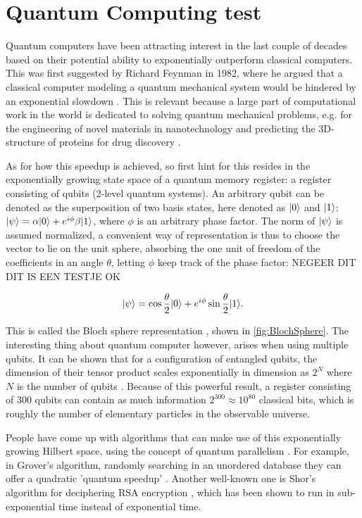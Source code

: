 \section{Quantum Computing test}

Quantum computers have been attracting interest in the last couple of decades based on their potential ability to exponentially outperform classical computers. This was first suggested by Richard Feynman in 1982, where he argued that a classical computer modeling a quantum mechanical system would be hindered by an exponential slowdown \cite{Feynman1982}. This is relevant because a large part of computational work in the world is dedicated to solving quantum mechanical problems, e.g. for the engineering of novel materials in nanotechnology and predicting the 3D-structure of proteins for drug discovery \cite{Robert2021}.

As for how this speedup is achieved, so first hint for this resides in the exponentially growing state space of a quantum memory register: a register consisting of qubits (2-level quantum systems). An arbitrary qubit can be denoted as the superposition of two basis states, here denoted as $\lvert0\rangle$ and $\lvert1\rangle$: $\lvert\psi\rangle = \alpha \lvert0\rangle + e^{i \phi} \beta \lvert1\rangle$, where $\phi$ is an arbitrary phase factor. The norm of  $\lvert\psi\rangle$ is assumed normalized, a convenient way of representation is thus to choose the vector to lie on the unit sphere, absorbing the one unit of freedom of the coefficients in an angle $\theta$, letting $\phi$ keep track of the phase factor: NEGEER DIT DIT IS EEN TESTJE OK

\begin{equation}\label{eq:qubit}
	\lvert\psi\rangle =
	\cos{\frac{\theta}{2}} \lvert0\rangle + e^{i \phi} \sin{\frac{\theta}{2}} \lvert1\rangle.
\end{equation}

This is called the Bloch sphere representation \cite{Nielsen2011}, shown in \cref{fig:BlochSphere}. The interesting thing about quantum computer however, arises when using multiple qubits. It can be shown that for a configuration of entangled qubits, the dimension of their tensor product scales exponentially in dimension as $2^N$ where $N$ is the number of qubits \cite{Nielsen2011,Henriet2020}. Because of this powerful result, a register consisting of 300 qubits can contain as much information $2^{300} \approx 10^{80}$ classical bits, which is roughly the number of elementary particles in the observable universe.

People have come up with algorithms that can make use of this exponentially growing Hilbert space, using the concept of quantum parallelism \cite{Nielsen2011}. For example, in Grover's algorithm, randomly searching in an unordered database they can offer a quadratic 'quantum speedup' \cite{Grover1996}. Another well-known one is Shor's algorithm for deciphering RSA encryption \cite{Shor1994}, which has been shown \cite{Vandersypen2001} to run in sub-exponential time instead of exponential time.

